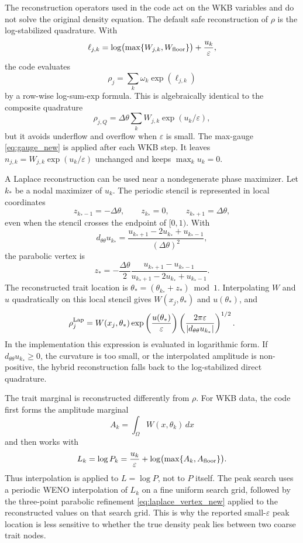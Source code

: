 \documentclass[11pt]{article}
\begin{document}
The reconstruction operators used in the code act on the WKB variables and do
not solve the original density equation.  The default safe reconstruction of
\(\rho\) is the log-stabilized quadrature.  With
\[
    \ell_{j,k}=\log\bigl(\max\{W_{j,k},W_{\rm floor}\}\bigr)
    +\frac{u_k}{\varepsilon},
\]
the code evaluates
\[
    \rho_j=\sum_k\omega_k\exp(\ell_{j,k})
\]
by a row-wise log-sum-exp formula.  This is algebraically identical to the
composite quadrature
\[
    \rho_{j,Q}=\Delta\theta\sum_k W_{j,k}\exp(u_k/\varepsilon),
\]
but it avoids underflow and overflow when \(\varepsilon\) is small.  The
max-gauge \eqref{eq:gauge_new} is applied after each WKB step.  It leaves
\(n_{j,k}=W_{j,k}\exp(u_k/\varepsilon)\) unchanged and keeps
\(\max_k u_k=0\).

A Laplace reconstruction can be used near a nondegenerate phase maximizer.  Let
\(k_*\) be a nodal maximizer of \(u_k\).  The periodic stencil is represented in
local coordinates
\[
    z_{k_*-1}=-\Delta\theta,
    \qquad
    z_{k_*}=0,
    \qquad
    z_{k_*+1}=\Delta\theta,
\]
even when the stencil crosses the endpoint of \([0,1)\).  With
\[
    d_{\theta\theta}u_{k_*}
    =\frac{u_{k_*+1}-2u_{k_*}+u_{k_*-1}}{(\Delta\theta)^2},
\]
the parabolic vertex is
\begin{equation}\label{eq:laplace_vertex_new}
    z_*=-\frac{\Delta\theta}{2}
    \frac{u_{k_*+1}-u_{k_*-1}}{u_{k_*+1}-2u_{k_*}+u_{k_*-1}}.
\end{equation}
The reconstructed trait location is
\(\theta_*=(\theta_{k_*}+z_*)\bmod 1\).  Interpolating \(W\) and \(u\)
quadratically on this local stencil gives \(W(x_j,\theta_*)\) and
\(u(\theta_*)\), and
\begin{equation}\label{eq:laplace_rho_new}
    \rho_j^{\rm Lap}
    =W(x_j,\theta_*)\exp\left(\frac{u(\theta_*)}{\varepsilon}\right)
    \left(\frac{2\pi\varepsilon}{|d_{\theta\theta}u_{k_*}|}\right)^{1/2}.
\end{equation}
In the implementation this expression is evaluated in logarithmic form.  If
\(d_{\theta\theta}u_{k_*}\ge0\), the curvature is too small, or the interpolated
amplitude is non-positive, the hybrid reconstruction falls back to the
log-stabilized direct quadrature.

The trait marginal is reconstructed differently from \(\rho\).  For WKB data,
the code first forms the amplitude marginal
\[
    A_k=\int_\Omega W(x,\theta_k)\,dx
\]
and then works with
\begin{equation}\label{eq:appendix_logP_new}
    L_k=\log P_k=\frac{u_k}{\varepsilon}+\log\bigl(\max\{A_k,A_{\rm floor}\}\bigr).
\end{equation}
Thus interpolation is applied to \(L=\log P\), not to \(P\) itself.  The peak
search uses a periodic WENO interpolation of \(L_k\) on a fine uniform search
grid, followed by the three-point parabolic refinement \eqref{eq:laplace_vertex_new}
applied to the reconstructed values on that search grid.  This is why the
reported small-\(\varepsilon\) peak location is less sensitive to whether the
true density peak lies between two coarse trait nodes.
\end{document}
